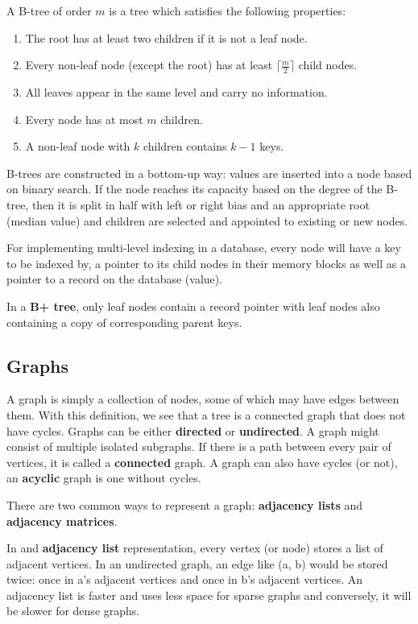 \documentclass{article}
\begin{document}
    A B-tree of order $m$ is a tree which satisfies the following properties:
    \begin{enumerate}
        \item The root has at least two children if it is not a leaf node.
        \item Every non-leaf node (except the root) has at least $ \lceil \frac{m}{2} \rceil$ child nodes.
        \item All leaves appear in the same level and carry no information.
        \item Every node has at most $m$ children.
        \item A non-leaf node with $k$ children contains $k-1$ keys.
    \end{enumerate}
    
    
    B-trees are constructed in a bottom-up way: values are inserted into a node based on binary search. If the node reaches its capacity based on the degree of the B-tree, then it is split in half with left or right bias and an appropriate root (median value) and children are selected and appointed to existing or new nodes.
    
    For implementing multi-level indexing in a database, every node will have a key to be indexed by, a pointer to its child nodes in their memory blocks as well as a pointer to a record on the database (value).
    
    In a \textbf{B+ tree}, only leaf nodes contain a record pointer with leaf nodes also containing a copy of corresponding parent keys.
    
    \subsection{Graphs}
    A graph is simply a collection of nodes, some of which may have edges between them. With this definition, we see that a tree is a connected graph that does not have cycles. Graphs can be either \textbf{directed} or \textbf{undirected}. A graph might consist of multiple isolated subgraphs. If there is a path between every pair of vertices, it is called a \textbf{connected} graph. A graph can also have cycles (or not), an \textbf{acyclic} graph is one without cycles. 
    
    There are two common ways to represent a graph: \textbf{adjacency lists} and \textbf{adjacency matrices}. 
    
    In and \textbf{adjacency list} representation, every vertex (or node) stores a list of adjacent vertices. In an undirected graph, an edge like (a, b) would be stored twice: once in a's adjacent vertices and once in b's adjacent vertices. An adjacency list is faster and uses less space for sparse graphs and conversely, it will be slower for dense graphs.
    
\end{document}
